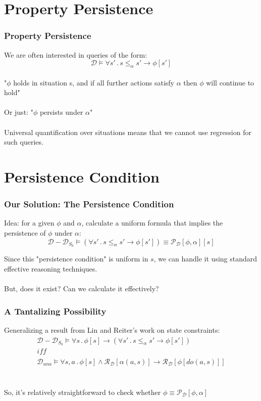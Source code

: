 \documentclass[compress]{beamer}
\begin{document}
\section{Property Persistence}

\begin{frame}
\frametitle{Property Persistence}
We are often interested in queries of the form:
\begin{equation*}
\mathcal{D} \models \forall s'\,.\,s \leq_{\alpha} s' \rightarrow \phi[s']
\end{equation*}
\ \\
"$\phi$ holds in situation s, and if all further actions satisfy $\alpha$ then $\phi$ will continue to hold"
\ \\
\ \\
Or just: "$\phi$ persists under $\alpha$"
\ \\
\ \\
Universal quantification over situations means that we cannot use regression
for such queries.
\end{frame}

\section{Persistence Condition}

\begin{frame}
\frametitle{Our Solution: The Persistence Condition}
Idea: for a given $\phi$ and $\alpha$, calculate a uniform formula that implies the persistence of $\phi$ under $\alpha$:
\begin{equation*}
  \mathcal{D}-\mathcal{D}_{S_0} \models \left(\forall s'\,.\,s \leq_{\alpha} s' \rightarrow \phi[s']\right) \equiv \mathcal{P}_{\mathcal{D}}[\phi,\alpha][s]
\end{equation*}

Since this "persistence condition" is uniform in $s$, we can handle it using
standard effective reasoning techniques.
\ \\
\ \\
But, does it exist? Can we calculate it effectively?
\end{frame}

\begin{frame}
\frametitle{A Tantalizing Possibility}
Generalizing a result from Lin and Reiter's work on state constraints:
\begin{gather*}
\mathcal{D}-\mathcal{D}_{S_{0}}\models\forall s\,.\,\phi[s]\rightarrow\left(\forall s'\,.\, s\leq_{\alpha}s'\rightarrow\phi[s']\right)\\
\mathit{iff}\\
\mathcal{D}_{una}\models\forall s,a\,.\,\phi[s]\wedge\mathcal{R}_{\mathcal{D}}[\alpha(a,s)]\rightarrow\mathcal{R}_{\mathcal{D}}[\phi[do(a,s)]]
\end{gather*}
\ \\
\ \\
So, it's relatively straightforward to check whether $\phi \equiv \mathcal{P}_{\mathcal{D}}[\phi,\alpha]$
\end{frame}
\end{document}
